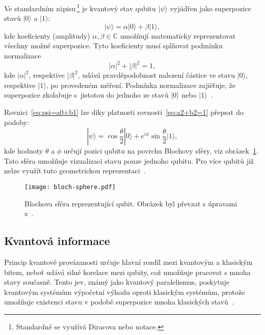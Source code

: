 Ve standardním zápisu\,\footnote{Standardně se využívá Diracova nebo  notace.} je kvantový stav qubitu $| \psi \rangle$ vyjádřen jako superpozice stavů $| 0 \rangle$ a $| 1 \rangle$:
\begin{equation}\label{eq:psi=a0+b1}
    | \psi \rangle = \alpha | 0 \rangle + \beta | 1 \rangle, 
\end{equation}
kde koeficienty (amplitudy) $\alpha, \beta \in \mathbb{C}$ umožňují matematicky reprezentovat všechny možné superpozice. 
Tyto koeficienty musí splňovat podmínku normalizace 
\begin{equation}\label{eq:a2+b2=1}
    \left| \alpha \right|^2 + \left| \beta \right|^2 = 1,   
\end{equation}
kde $\left| \alpha \right|^2$, respektive $\left| \beta \right|^2$, udává pravděpodobnost nalezení částice ve stavu $| 0 \rangle$, respektive $| 1 \rangle$, po provedeném měření. 
Podmínka normalizace zajišťuje, že superpozice zkolabuje s~jistotou do jednoho ze stavů $| 0 \rangle$ nebo $| 1 \rangle$~\cite{NaturalComputing,QuantumComputing-Curious}.

Rovnici~\ref{eq:psi=a0+b1} lze díky platnosti rovnosti~\ref{eq:a2+b2=1} přepsat do podoby:
\begin{equation*}
    | \psi \rangle = \cos{\frac{\theta}{2}} | 0 \rangle +  e^{i\phi} \sin{\frac{\theta}{2}} | 1 \rangle,
\end{equation*}
kde hodnoty $\theta$ a $\phi$ určují pozici qubitu na povrchu Blochovy sféry, viz obrázek~\ref{fig:bloch-sphere}. 
Tato sféra umožňuje vizualizaci stavu pouze jednoho qubitu. 
Pro více qubitů již nelze využít tuto geometrickou reprezentaci~\cite{QuantumComputing-Curious,QuantumComputing-QuantumInformation}. 

\begin{figure}[ht!]
    \centering
    \texttt{[image: bloch-sphere.pdf]}
    \caption{Blochova sféra reprezentující qubit. Obrázek byl převzat s úpravami z~\cite{QuantumComputing-QuantumInformation}.}
    \label{fig:bloch-sphere}
\end{figure}

\subsection{Kvantová informace}
Princip kvantové provázanosti určuje hlavní rozdíl mezi kvantovým a klasickým bitem, neboť udává silné korelace mezi qubity, což umožňuje pracovat s mnoha stavy současně. 
Tento jev, známý jako kvantový paralelismus, poskytuje kvantovým systémům výpočetní výhodu oproti klasickým systémům, protože umožňuje existenci stavu v podobě superpozice mnoha klasických stavů~\cite{NaturalComputing}.

